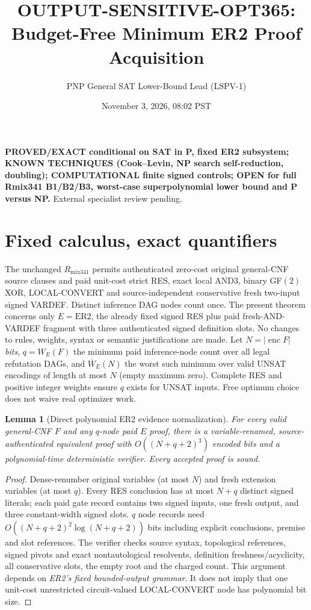 \documentclass[11pt]{article}
\title{OUTPUT-SENSITIVE-OPT365: Budget-Free Minimum ER2 Proof Acquisition}
\author{PNP General SAT Lower-Bound Lead (LSPV-1)}
\date{November 3, 2026, 08:02 PST}
\newtheorem{lemma}[theorem]{Lemma}
\begin{document}
\maketitle
\noindent\textbf{PROVED/EXACT conditional on SAT in P, fixed ER2 subsystem; KNOWN TECHNIQUES (Cook--Levin, NP search self-reduction, doubling); COMPUTATIONAL finite signed controls; OPEN for full Rmix341 B1/B2/B3, worst-case superpolynomial lower bound and P versus NP.} External specialist review pending.

\section*{Fixed calculus, exact quantifiers}
The unchanged $R_{\mathrm{mix341}}$ permits authenticated zero-cost original general-CNF source clauses and paid unit-cost strict RES, exact local AND3, binary GF$(2)$ XOR, LOCAL-CONVERT and source-independent conservative fresh two-input signed VARDEF. Distinct inference DAG nodes count once. The present theorem concerns only $E=\mathrm{ER2}$, the already fixed signed RES plus paid fresh-AND-VARDEF fragment with three authenticated signed definition slots. No changes to rules, weights, syntax or semantic justifications are made. Let $N=|\operatorname{enc}F|$ \emph{bits}, $q=W_E(F)$ the minimum paid inference-node count over all legal refutation DAGs, and $\overline W_E(N)$ the worst such minimum over valid UNSAT encodings of length at most $N$ (empty maximum zero). Complete RES and positive integer weights ensure $q$ exists for UNSAT inputs. Free optimum choice does not waive real optimizer work.

\begin{lemma}[Direct polynomial ER2 evidence normalization]
For every valid general-CNF $F$ and any $q$-node paid $E$ proof, there is a variable-renamed, source-authenticated equivalent proof with $O((N+q+2)^3)$ encoded bits and a polynomial-time deterministic verifier. Every accepted proof is sound.
\end{lemma}
\begin{proof}
Dense-renumber original variables (at most $N$) and fresh extension variables (at most $q$). Every RES conclusion has at most $N+q$ distinct signed literals; each paid gate record contains two signed inputs, one fresh output, and three constant-width signed slots. $q$ node records need $O((N+q+2)^2\log(N+q+2))$ bits including explicit conclusions, premise and slot references. The verifier checks source syntax, topological references, signed pivots and exact nontautological resolvents, definition freshness/acyclicity, all conservative slots, the empty root and the charged count. This argument depends on \emph{ER2's fixed bounded-output grammar}. It does not imply that one unit-cost unrestricted circuit-valued LOCAL-CONVERT node has polynomial bit size.
\end{proof}
\end{document}
